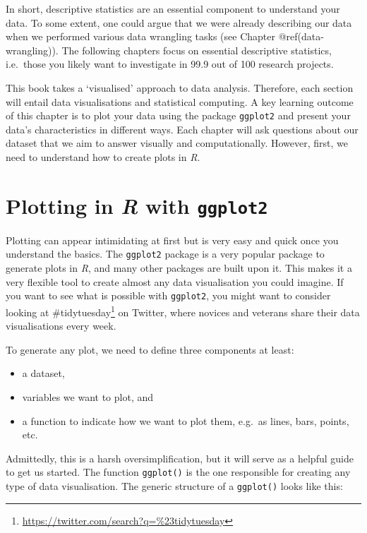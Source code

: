 \documentclass[
  letterpaper,
]{krantz}
\renewcommand{\href}[2]{#2\footnote{\url{#1}}}
\begin{document}
In short, descriptive statistics are an essential component to
understand your data. To some extent, one could argue that we were
already describing our data when we performed various data wrangling
tasks (see Chapter @ref(data-wrangling)). The following chapters focus
on essential descriptive statistics, i.e.~those you likely want to
investigate in 99.9 out of 100 research projects.

This book takes a `visualised' approach to data analysis. Therefore,
each section will entail data visualisations and statistical computing.
A key learning outcome of this chapter is to plot your data using the
package \texttt{ggplot2} and present your data's characteristics in
different ways. Each chapter will ask questions about our dataset that
we aim to answer visually and computationally. However, first, we need
to understand how to create plots in \emph{R}.

\section{\texorpdfstring{Plotting in \emph{R} with
\texttt{ggplot2}}{Plotting in R with ggplot2}}\label{sec-plotting-in-r-with-ggplot2}

Plotting can appear intimidating at first but is very easy and quick
once you understand the basics. The \texttt{ggplot2} package is a very
popular package to generate plots in \emph{R}, and many other packages
are built upon it. This makes it a very flexible tool to create almost
any data visualisation you could imagine. If you want to see what is
possible with \texttt{ggplot2}, you might want to consider looking at
\href{https://twitter.com/search?q=\%23tidytuesday}{\#tidytuesday} on
Twitter, where novices and veterans share their data visualisations
every week.

To generate any plot, we need to define three components at least:

\begin{itemize}
\item
  a dataset,
\item
  variables we want to plot, and
\item
  a function to indicate how we want to plot them, e.g.~as lines, bars,
  points, etc.
\end{itemize}

Admittedly, this is a harsh oversimplification, but it will serve as a
helpful guide to get us started. The function \texttt{ggplot()} is the
one responsible for creating any type of data visualisation. The generic
structure of a \texttt{ggplot()} looks like this:
\end{document}
